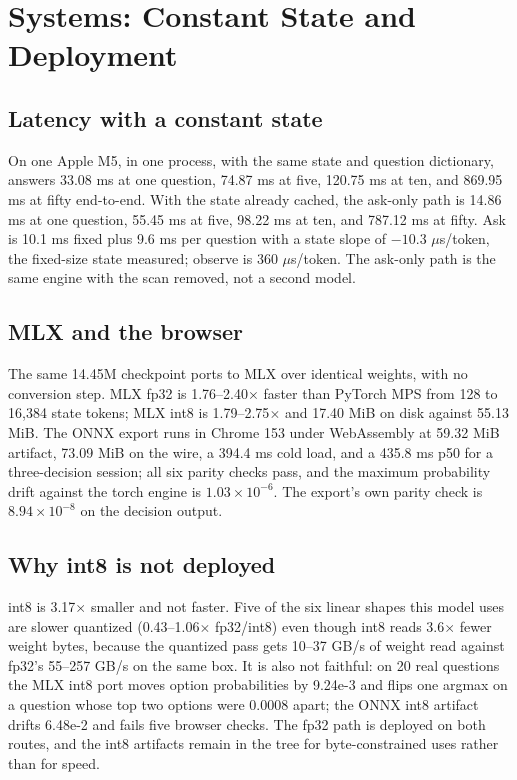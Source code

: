 \section{Systems: Constant State and Deployment}
\label{sec:systems}

\subsection{Latency with a constant state}
On one Apple M5, in one process, with the same state and question dictionary, \stream{} answers
33.08 ms at one question, 74.87 ms at five, 120.75 ms at ten, and 869.95 ms at fifty end-to-end.
With the state already cached, the ask-only path is 14.86 ms at one question, 55.45 ms at five,
98.22 ms at ten, and 787.12 ms at fifty. Ask is 10.1 ms fixed plus 9.6 ms per question with a
state slope of $-10.3$ $\mu$s/token, the fixed-size state measured; observe is 360 $\mu$s/token.
The ask-only path is the same engine with the scan removed, not a second model.

\subsection{MLX and the browser}
The same 14.45M checkpoint ports to MLX over identical weights, with no conversion step. MLX fp32
is 1.76--2.40$\times$ faster than PyTorch MPS from 128 to 16{,}384 state tokens; MLX int8 is
1.79--2.75$\times$ and 17.40 MiB on disk against 55.13 MiB. The ONNX export runs in Chrome 153
under WebAssembly at 59.32 MiB artifact, 73.09 MiB on the wire, a 394.4 ms cold load, and a 435.8
ms p50 for a three-decision session; all six parity checks pass, and the maximum probability drift
against the torch engine is $1.03\times10^{-6}$. The export's own parity check is
$8.94\times10^{-8}$ on the decision output.

\subsection{Why int8 is not deployed}
int8 is 3.17$\times$ smaller and not faster. Five of the six linear shapes this model uses are
slower quantized (0.43--1.06$\times$ fp32/int8) even though int8 reads 3.6$\times$ fewer weight
bytes, because the quantized pass gets 10--37 GB/s of weight read against fp32's 55--257 GB/s on
the same box. It is also not faithful: on 20 real questions the MLX int8 port moves option
probabilities by 9.24e-3 and flips one argmax on a question whose top two options were 0.0008
apart; the ONNX int8 artifact drifts 6.48e-2 and fails five browser checks. The fp32 path is deployed on
both routes, and the int8 artifacts remain in the tree for byte-constrained uses rather than for
speed.

